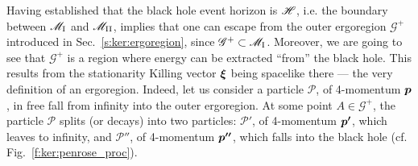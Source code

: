 Having established that the black hole event horizon is $\mathscr{H}$, i.e.
the boundary between $\mathscr{M}_{\rm I}$ and $\mathscr{M}_{\rm II}$, implies that
one can escape from the outer ergoregion $\mathscr{G}^+$
introduced in Sec.~\ref{s:ker:ergoregion}, since $\mathscr{G}^+ \subset \mathscr{M}_{\rm I}$.
Moreover, we are going to see that $\mathscr{G}^+$  is a region where energy can be extracted ``from''
the black hole. This results from the stationarity Killing
vector $\bm{\xi}$ being spacelike there --- the very definition of an
ergoregion. Indeed, let us consider a particle $\mathscr{P}$, of 4-momentum $\bm{p}$,
in free fall from infinity into the outer ergoregion. At some point $A\in \mathscr{G}^+$, the particle $\mathscr{P}$
splits (or decays) into two particles: $\mathscr{P}'$, of 4-momentum $\bm{p'}$, which leaves to infinity, and $\mathscr{P}''$, of 4-momentum $\bm{p''}$, which falls into the black hole (cf. Fig.~\ref{f:ker:penrose_proc}).

